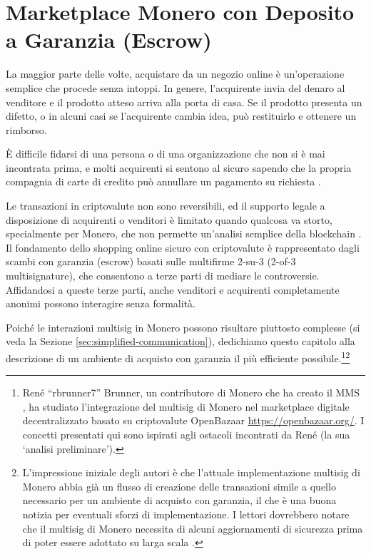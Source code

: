 \chapter{Marketplace Monero con Deposito a Garanzia (Escrow)}
\label{chapter:escrowed-market}

La maggior parte delle volte, acquistare da un negozio online è un'operazione semplice che procede senza intoppi. In genere, l'acquirente invia del denaro al venditore e il prodotto atteso arriva alla porta di casa. Se il prodotto presenta un difetto, o in alcuni casi se l'acquirente cambia idea, può restituirlo e ottenere un rimborso.

È difficile fidarsi di una persona o di una organizzazione che non si è mai incontrata prima, e molti acquirenti si sentono al sicuro sapendo che la propria compagnia di carte di credito può annullare un pagamento su richiesta \cite{credit-card-reversals}.

Le transazioni in criptovalute non sono reversibili, ed il supporto legale a disposizione di acquirenti o venditori è limitato quando qualcosa va storto, specialmente per Monero, che non permette un'analisi semplice della blockchain \cite{chainalysis-2020-report}. Il fondamento dello shopping online sicuro con criptovalute è rappresentato dagli scambi con garanzia (escrow) basati sulle multifirme 2-su-3 (2-of-3 multisignature), che consentono a terze parti di mediare le controversie. Affidandosi a queste terze parti, anche venditori e acquirenti completamente anonimi possono interagire senza formalità.

Poiché le interazioni multisig in Monero possono risultare piuttosto complesse (si veda la Sezione \ref{sec:simplified-communication}), dedichiamo questo capitolo alla descrizione di un ambiente di acquisto con garanzia il più efficiente possibile.\footnote{René ``rbrunner7'' Brunner, un contributore di Monero che ha creato il MMS \cite{mms-project-proposal, mms-manual}, ha studiato l'integrazione del multisig di Monero nel marketplace digitale decentralizzato basato su criptovalute OpenBazaar \url{https://openbazaar.org/}. I concetti presentati qui sono ispirati agli ostacoli incontrati da René \cite{openbazaar-rbrunner-investigation} (la sua `analisi preliminare').}\footnote{L'impressione iniziale degli autori è che l'attuale implementazione multisig di Monero abbia già un flusso di creazione delle transazioni simile a quello necessario per un ambiente di acquisto con garanzia, il che è una buona notizia per eventuali sforzi di implementazione. I lettori dovrebbero notare che il multisig di Monero necessita di alcuni aggiornamenti di sicurezza prima di poter essere adottato su larga scala \cite{multisig-research-issue-67}.}



